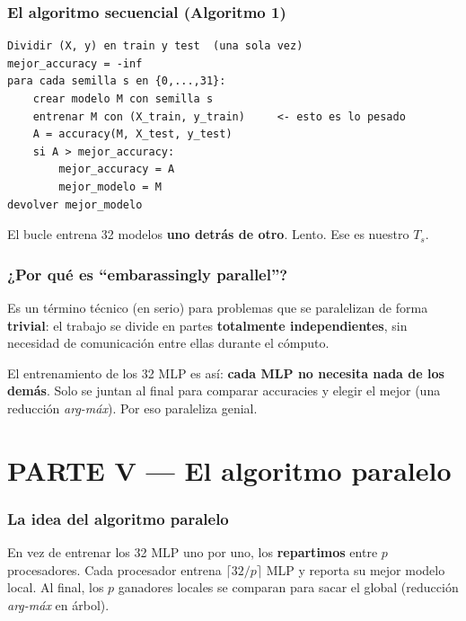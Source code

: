 \documentclass[11pt,a4paper]{article}
\begin{document}
\section{El algoritmo secuencial (Algoritmo 1)}

\begin{caja}[title=\textbf{Algoritmo 1 --- secuencial}]
\begin{verbatim}
Dividir (X, y) en train y test  (una sola vez)
mejor_accuracy = -inf
para cada semilla s en {0,...,31}:
    crear modelo M con semilla s
    entrenar M con (X_train, y_train)     <- esto es lo pesado
    A = accuracy(M, X_test, y_test)
    si A > mejor_accuracy:
        mejor_accuracy = A
        mejor_modelo = M
devolver mejor_modelo
\end{verbatim}
\end{caja}

El bucle entrena 32 modelos \textbf{uno detrás de otro}. Lento. Ese es nuestro
$T_s$.

\section{¿Por qué es ``embarassingly parallel''?}

\begin{importante}[title=\textbf{Embarassingly parallel = vergonzosamente paralelo}]
Es un término técnico (en serio) para problemas que se paralelizan de forma
\textbf{trivial}: el trabajo se divide en partes \textbf{totalmente
independientes}, sin necesidad de comunicación entre ellas durante el cómputo.

El entrenamiento de los 32 MLP es así: \textbf{cada MLP no necesita nada de los
demás}. Solo se juntan al final para comparar accuracies y elegir el mejor
(una reducción \emph{arg-máx}). Por eso paraleliza genial.
\end{importante}

\part*{PARTE V --- El algoritmo paralelo}

\section{La idea del algoritmo paralelo}

En vez de entrenar los 32 MLP uno por uno, los \textbf{repartimos} entre $p$
procesadores. Cada procesador entrena $\lceil 32/p \rceil$ MLP y reporta su
mejor modelo local. Al final, los $p$ ganadores locales se comparan para sacar
el global (reducción \emph{arg-máx} en árbol).
\end{document}
